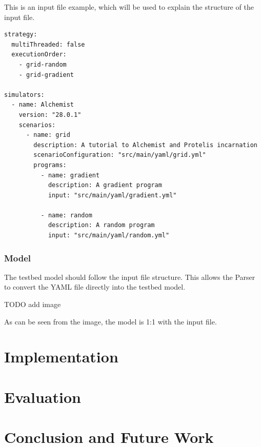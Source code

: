 \documentclass[12pt,a4paper,openright,twoside]{book}
\begin{document}
This is an input file example, which will be used to explain the structure of the input file.

\begin{lstlisting}[style=yaml]
strategy:
  multiThreaded: false
  executionOrder:
    - grid-random
    - grid-gradient

simulators:
  - name: Alchemist
    version: "28.0.1"
    scenarios:
      - name: grid
        description: A tutorial to Alchemist and Protelis incarnation
        scenarioConfiguration: "src/main/yaml/grid.yml"
        programs:
          - name: gradient
            description: A gradient program
            input: "src/main/yaml/gradient.yml"

          - name: random
            description: A random program
            input: "src/main/yaml/random.yml"
\end{lstlisting}

\subsection{Model}
The testbed model should follow the input file structure. 
This allows the Parser to convert the YAML file directly into the testbed model.

TODO add image

As can be seen from the image, the model is 1:1 with the input file.

\chapter{Implementation}

\chapter{Evaluation}

\chapter{Conclusion and Future Work}
\end{document}
